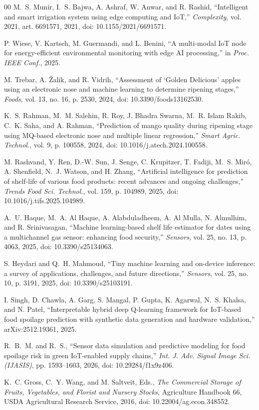 \documentclass[conference]{IEEEtran}
\begin{document}
\begin{thebibliography}{00}
 M.~S. Munir, I.~S. Bajwa, A. Ashraf, W. Anwar, and R. Rashid, ``Intelligent and smart irrigation system using edge computing and IoT,'' \textit{Complexity}, vol. 2021, art. 6691571, 2021, doi: 10.1155/2021/6691571.

 P. Wiese, V. Kartsch, M. Guermandi, and L. Benini, ``A multi-modal IoT node for energy-efficient environmental monitoring with edge AI processing,'' in \textit{Proc. IEEE Conf.}, 2025.

 M. Trebar, A. \v{Z}alik, and R. Vidrih, ``Assessment of `Golden Delicious' apples using an electronic nose and machine learning to determine ripening stages,'' \textit{Foods}, vol. 13, no. 16, p. 2530, 2024, doi: 10.3390/foods13162530.

 K.~S. Rahman, M.~M. Salehin, R. Roy, J. Bhadra Swarna, M.~R. Islam Rakib, C.~K. Saha, and A. Rahman, ``Prediction of mango quality during ripening stage using MQ-based electronic nose and multiple linear regression,'' \textit{Smart Agric. Technol.}, vol. 9, p. 100558, 2024, doi: 10.1016/j.atech.2024.100558.

 M. Rashvand, Y. Ren, D.-W. Sun, J. Senge, C. Krupitzer, T. Fadiji, M.~S. Mir\'o, A. Shenfield, N.~J. Watson, and H. Zhang, ``Artificial intelligence for prediction of shelf-life of various food products: recent advances and ongoing challenges,'' \textit{Trends Food Sci. Technol.}, vol. 159, p. 104989, 2025, doi: 10.1016/j.tifs.2025.104989.

 A.~U. Haque, M.~A. Al Haque, A. Alabduladheem, A. Al Mulla, N. Almulhim, and R. Srinivasagan, ``Machine learning-based shelf life estimator for dates using a multichannel gas sensor: enhancing food security,'' \textit{Sensors}, vol. 25, no. 13, p. 4063, 2025, doi: 10.3390/s25134063.

 S. Heydari and Q.~H. Mahmoud, ``Tiny machine learning and on-device inference: a survey of applications, challenges, and future directions,'' \textit{Sensors}, vol. 25, no. 10, p. 3191, 2025, doi: 10.3390/s25103191.

 I. Singh, D. Chawla, A. Garg, S. Mangal, P. Gupta, K. Agarwal, N.~S. Khalsa, and N. Patel, ``Interpretable hybrid deep Q-learning framework for IoT-based food spoilage prediction with synthetic data generation and hardware validation,'' arXiv:2512.19361, 2025.

 R.~B.~M. and R.~S., ``Sensor data simulation and predictive modeling for food spoilage risk in green IoT-enabled supply chains,'' \textit{Int. J. Adv. Signal Image Sci. (IJASIS)}, pp. 1593--1603, 2026, doi: 10.29284/f1x9z406.

 K.~C. Gross, C.~Y. Wang, and M. Saltveit, Eds., \textit{The Commercial Storage of Fruits, Vegetables, and Florist and Nursery Stocks}, Agriculture Handbook 66, USDA Agricultural Research Service, 2016, doi: 10.22004/ag.econ.348552.

\end{thebibliography}
\end{document}
